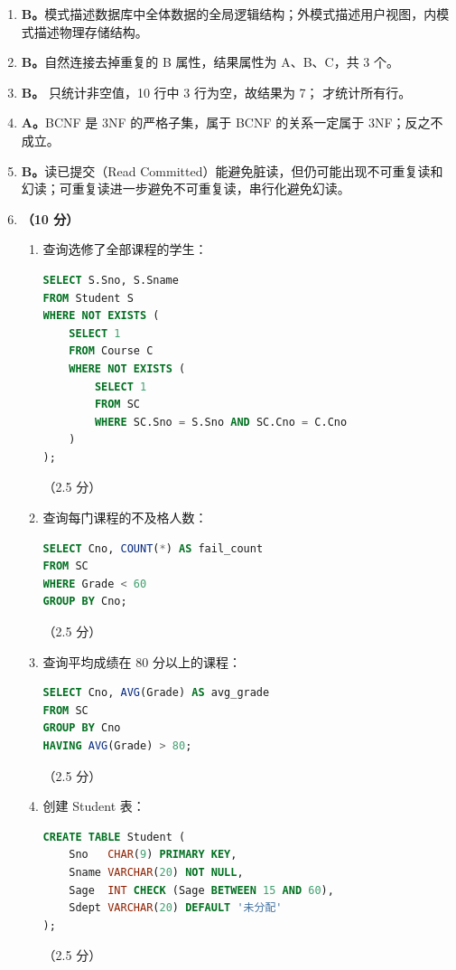 \documentclass[a4paper,11pt]{article}
\begin{document}
\begin{enumerate}[start=21, label=\textbf{\arabic*.}, leftmargin=2.4em, itemsep=0.45em]

\item \textbf{B。}模式描述数据库中全体数据的全局逻辑结构；外模式描述用户视图，内模式描述物理存储结构。

\item \textbf{B。}自然连接去掉重复的 B 属性，结果属性为 A、B、C，共 3 个。

\item \textbf{B。} 只统计非空值，10 行中 3 行为空，故结果为 7； 才统计所有行。

\item \textbf{A。}BCNF 是 3NF 的严格子集，属于 BCNF 的关系一定属于 3NF；反之不成立。

\item \textbf{B。}读已提交（Read Committed）能避免脏读，但仍可能出现不可重复读和幻读；可重复读进一步避免不可重复读，串行化避免幻读。

\item \textbf{（10 分）}
\begin{enumerate}[label=（\arabic*）, leftmargin=2.2em, itemsep=2pt]
  \item 查询选修了全部课程的学生：
\begin{lstlisting}[language=SQL]
SELECT S.Sno, S.Sname
FROM Student S
WHERE NOT EXISTS (
    SELECT 1
    FROM Course C
    WHERE NOT EXISTS (
        SELECT 1
        FROM SC
        WHERE SC.Sno = S.Sno AND SC.Cno = C.Cno
    )
);
\end{lstlisting}
\hfill（2.5 分）

  \item 查询每门课程的不及格人数：
\begin{lstlisting}[language=SQL]
SELECT Cno, COUNT(*) AS fail_count
FROM SC
WHERE Grade < 60
GROUP BY Cno;
\end{lstlisting}
\hfill（2.5 分）

  \item 查询平均成绩在 80 分以上的课程：
\begin{lstlisting}[language=SQL]
SELECT Cno, AVG(Grade) AS avg_grade
FROM SC
GROUP BY Cno
HAVING AVG(Grade) > 80;
\end{lstlisting}
\hfill（2.5 分）

  \item 创建 Student 表：
\begin{lstlisting}[language=SQL]
CREATE TABLE Student (
    Sno   CHAR(9) PRIMARY KEY,
    Sname VARCHAR(20) NOT NULL,
    Sage  INT CHECK (Sage BETWEEN 15 AND 60),
    Sdept VARCHAR(20) DEFAULT '未分配'
);
\end{lstlisting}
\hfill（2.5 分）
\end{enumerate}


\end{enumerate}
\end{document}
